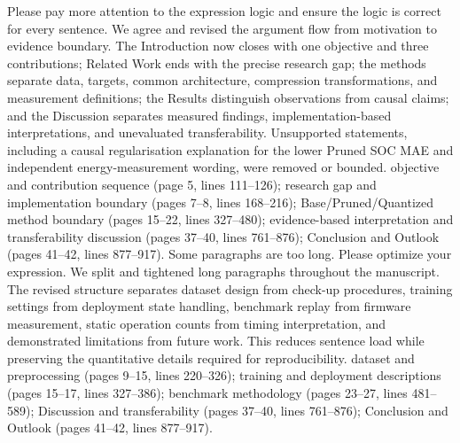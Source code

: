 {}
\markdownRendererSectionEnd \markdownRendererSectionBegin
{}\markdownRendererInterblockSeparator
{}\markdownRendererBlockQuoteBegin
Please pay more attention to the expression logic and ensure the logic is correct for every sentence.\markdownRendererBlockQuoteEnd \markdownRendererInterblockSeparator
{} We agree and revised the argument flow from motivation to evidence boundary. The Introduction now closes with one objective and three contributions; Related Work ends with the precise research gap; the methods separate data, targets, common architecture, compression transformations, and measurement definitions; the Results distinguish observations from causal claims; and the Discussion separates measured findings, implementation-based interpretations, and unevaluated transferability. Unsupported statements, including a causal regularisation explanation for the lower Pruned SOC MAE and independent energy-measurement wording, were removed or bounded.\markdownRendererParagraphSeparator
{} objective and contribution sequence (page 5, lines 111--126); research gap and implementation boundary (pages 7--8, lines 168--216); Base/Pruned/Quantized method boundary (pages 15--22, lines 327--480); evidence-based interpretation and transferability discussion (pages 37--40, lines 761--876); Conclusion and Outlook (pages 41--42, lines 877--917).\markdownRendererInterblockSeparator
{}
\markdownRendererSectionEnd \markdownRendererSectionBegin
{}\markdownRendererInterblockSeparator
{}\markdownRendererBlockQuoteBegin
Some paragraphs are too long. Please optimize your expression.\markdownRendererBlockQuoteEnd \markdownRendererInterblockSeparator
{} We split and tightened long paragraphs throughout the manuscript. The revised structure separates dataset design from check-up procedures, training settings from deployment state handling, benchmark replay from firmware measurement, static operation counts from timing interpretation, and demonstrated limitations from future work. This reduces sentence load while preserving the quantitative details required for reproducibility.\markdownRendererParagraphSeparator
{} dataset and preprocessing (pages 9--15, lines 220--326); training and deployment descriptions (pages 15--17, lines 327--386); benchmark methodology (pages 23--27, lines 481--589); Discussion and transferability (pages 37--40, lines 761--876); Conclusion and Outlook (pages 41--42, lines 877--917).\markdownRendererInterblockSeparator
